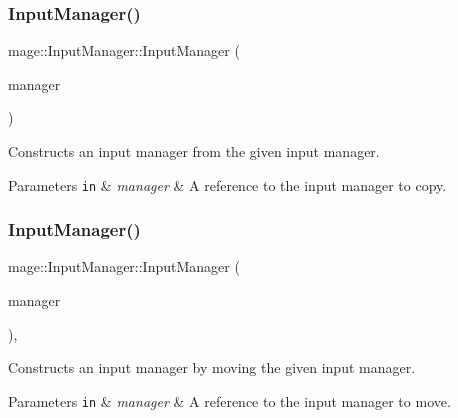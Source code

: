 \subsubsection{\texorpdfstring{Input\+Manager()}{InputManager()}\hspace{0.1cm}{\footnotesize\ttfamily [2/3]}}
{\footnotesize\ttfamily mage\+::\+Input\+Manager\+::\+Input\+Manager (\begin{DoxyParamCaption}\item[{const \hyperlink{classmage_1_1_input_manager}{Input\+Manager} \&}]{manager }\end{DoxyParamCaption})\hspace{0.3cm}{\ttfamily [delete]}}

Constructs an input manager from the given input manager.


\begin{DoxyParams}[1]{Parameters}
\mbox{\tt in}  & {\em manager} & A reference to the input manager to copy. \\
\hline
\end{DoxyParams}
\hypertarget{classmage_1_1_input_manager_a91ec89b9b721f686bfd932187144742e}{}\label{classmage_1_1_input_manager_a91ec89b9b721f686bfd932187144742e} 
\subsubsection{\texorpdfstring{Input\+Manager()}{InputManager()}\hspace{0.1cm}{\footnotesize\ttfamily [3/3]}}
{\footnotesize\ttfamily mage\+::\+Input\+Manager\+::\+Input\+Manager (\begin{DoxyParamCaption}\item[{\hyperlink{classmage_1_1_input_manager}{Input\+Manager} \&\&}]{manager }\end{DoxyParamCaption})\hspace{0.3cm}{\ttfamily [default]}, {\ttfamily [noexcept]}}

Constructs an input manager by moving the given input manager.


\begin{DoxyParams}[1]{Parameters}
\mbox{\tt in}  & {\em manager} & A reference to the input manager to move. \\
\hline
\end{DoxyParams}
\hypertarget{classmage_1_1_input_manager_a287ca0e91ec079227c102f7eadd5bb46}{}\label{classmage_1_1_input_manager_a287ca0e91ec079227c102f7eadd5bb46} 
